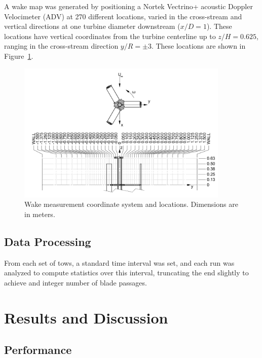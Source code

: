 \documentclass[energies,article,accept,moreauthors,pdftex,12pt,a4paper]{mdpi}
\begin{document}
A wake map was generated by positioning a Nortek Vectrino+ acoustic Doppler
Velocimeter (ADV) at 270 different locations, varied in the cross-stream and
vertical directions at one turbine diameter downstream ($x/D=1$). These
locations have vertical coordinates from the turbine centerline up to
$z/H=0.625$, ranging in the cross-stream direction $y/R = \pm 3$. These
locations are shown in Figure~\ref{fig:wake-locations}.

\begin{figure}
\centering
\includegraphics[width=0.9\textwidth]{figures/turbine_coordinate_system}
\caption{Wake measurement coordinate system and locations. Dimensions are in
meters.} 
\label{fig:wake-locations}
\end{figure}

\subsection{Data Processing}

From each set of tows, a standard time interval was set, and each run was
analyzed to compute statistics over this interval, truncating the end slightly
to achieve and integer number of blade passages.



\section{Results and Discussion}


\subsection{Performance}
\end{document}
